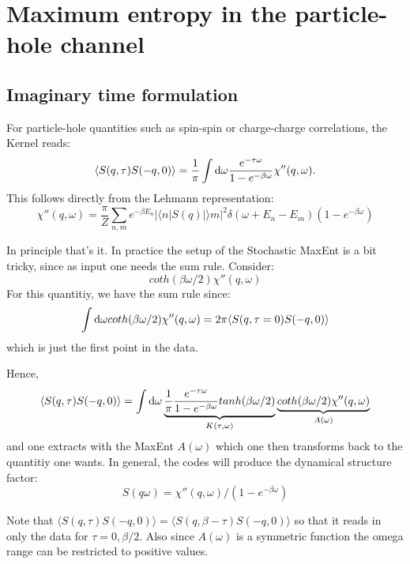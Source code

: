 \documentclass[12pt]{article}
\begin{document}
\section{Maximum entropy in the  particle-hole channel}
\subsection{Imaginary time formulation}
	 For particle-hole quantities such as spin-spin or charge-charge correlations, 
the  Kernel reads:
\begin{equation}
	\langle S(q,\tau) S(-q,0) \rangle  = \frac{1}{\pi} 
   \int {\rm d} \omega  \frac{e^{- \tau \omega} }{ 1 - e^{-\beta  \omega} } \chi''(q,\omega).
\end{equation}
This follows directly from the  Lehmann representation: 
\begin{equation}
 \chi''(q,\omega)  = \frac{\pi}{Z} \sum_{n,m} e^{-\beta E_n} |\langle n | S(q) | \rangle m |^2 
\delta ( \omega + E_n - E_m) \left( 1 - e^{-\beta  \omega} \right) 
\end{equation}

In principle that's it. In practice  the setup of the Stochastic MaxEnt is a bit tricky, 
since as input one  needs the sum rule.  
Consider: 
\begin{equation}
	coth(\beta \omega/2) \chi''(q,\omega)
\end{equation}
For this quantitiy, we have the sum rule since: 
\begin{equation}
	\int {\rm d} \omega 	coth(\beta \omega/2) \chi''(q,\omega) = 
  2 \pi \langle S(q,\tau=0) S(-q,0) \rangle
\end{equation}
which is just the first point in the data. 

Hence,
\begin{equation}
	\langle S(q,\tau) S(-q,0) \rangle  =  
       \int {\rm d} \omega  \underbrace{ \frac{1}{\pi} \frac{e^{- \tau \omega} }
            { 1 - e^{-\beta  \omega} } tanh(\beta \omega/2)  }_{K(\tau,\omega)} 
       \underbrace{ coth(\beta \omega/2)   \chi''(q,\omega) }_{A(\omega)} 
\end{equation}
and one extracts with the MaxEnt $A(\omega) $ which one then transforms back to the 
quantitiy one wants.  In general,  the codes will produce the dynamical  structure factor: 
\begin{equation}
 S(q\omega)  = \chi''(q,\omega)/\left( 1 - e^{-\beta  \omega} \right)    
\end{equation}

Note  that 
$\langle S(q,\tau) S(-q,0) \rangle  =  \langle S(q,\beta - \tau) S(-q,0) \rangle   $ so that 
it reads in only  the data for $ \tau = 0,\beta/2 $.  
Also since $A(\omega) $ is a symmetric function the omega range  can be restricted to positive values. 
\end{document}
